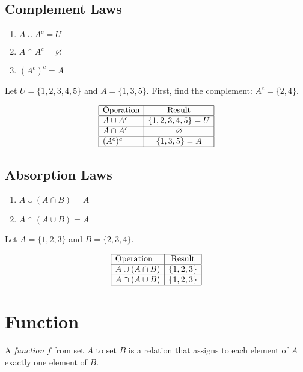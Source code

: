 \documentclass[12pt,a4paper,openany]{article}
\begin{document}
\subsection{Complement Laws}

\begin{enumerate}
    \item $A \cup A^c = U$
    \item $A \cap A^c = \varnothing$
    \item $(A^c)^c = A$
\end{enumerate}

Let $U = \{1, 2, 3, 4, 5\}$ and $A = \{1, 3, 5\}$.  
First, find the complement: $A^c = \{2, 4\}$.

\[
\begin{array}{|l|c|}
\hline
\text{Operation} & \text{Result} \\ \hline
A \cup A^c & \{1, 2, 3, 4, 5\} = U \\ \hline
A \cap A^c & \varnothing \\ \hline
(A^c)^c & \{1, 3, 5\} = A \\ \hline
\end{array}
\]


\subsection{Absorption Laws}

\begin{enumerate}
    \item $A \cup (A \cap B) = A$
    \item $A \cap (A \cup B) = A$
\end{enumerate}

Let $A = \{1, 2, 3\}$ and $B = \{2, 3, 4\}$.

\[
\begin{array}{|l|c|}
\hline
\text{Operation} & \text{Result} \\ \hline
A \cup (A \cap B) & \{1, 2, 3\} \\ \hline
A \cap (A \cup B) & \{1, 2, 3\} \\ \hline
\end{array}
\]



\section{Function}

A \textit{function} $f$ from set $A$ to set $B$ is a relation that assigns to each element of $A$ exactly one element of $B$.
\end{document}
